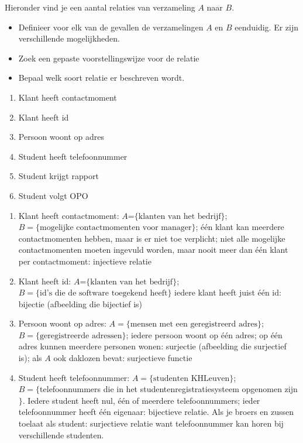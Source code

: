 \begin{oef}
Hieronder vind je een aantal relaties van verzameling $A$ naar $B$. 
\begin{itemize}
\item Definieer voor elk van de gevallen de verzamelingen $A$ en $B$ eenduidig. Er zijn verschillende mogelijkheden.
\item Zoek een gepaste voorstellingswijze voor de relatie
\item Bepaal  welk soort relatie er beschreven wordt.
\end{itemize}
\begin{enumerate}
\item Klant heeft contactmoment
\item Klant heeft id
\item Persoon woont op adres
\item Student heeft telefoonnummer
\item Student krijgt rapport
\item Student volgt OPO
\end{enumerate}
\begin{opl}
\begin{enumerate}

\item Klant heeft contactmoment: $A$=$\{\text{klanten van het bedrijf}\}$; \\
$B=\{\text{mogelijke contactmomenten voor manager}\}$; 
\'e\'en klant kan meerdere contactmomenten hebben, maar is er niet toe verplicht; 
niet alle mogelijke contactmomenten moeten ingevuld worden, maar nooit meer dan \'e\'en klant per contactmoment: injectieve relatie

\item Klant heeft id: $A$=$\{\text{klanten van het bedrijf}\}$; \\
$B=\{\text{id's die de software toegekend heeft}\}$ 
iedere klant heeft juist \'e\'en id: bijectie (afbeelding die bijectief is)

\item Persoon woont op adres: $A=\{\text{mensen met een geregistreerd adres}\}$; \\
$B=\{\text{geregistreerde adressen}\}$; iedere persoon woont op \'e\'en adres; op \'e\'en adres kunnen meerdere personen wonen: surjectie (afbeelding die surjectief is); als $A$ ook daklozen bevat: surjectieve functie

\item Student heeft telefoonnummer: $A=\{\text{studenten KHLeuven}\}$; \\
$B=\{$telefoonnummers die in het studentenregistratiesysteem opgenomen zijn$\}$.  Iedere student heeft nul, \'e\'en of meerdere telefoonnummers; ieder telefoonnummer heeft \'e\'en eigenaar: bijectieve relatie.
Als je broers en zussen toelaat als student: surjectieve relatie want telefoonnummer kan horen bij verschillende studenten.


\end{enumerate}
\end{opl}
\end{oef}
